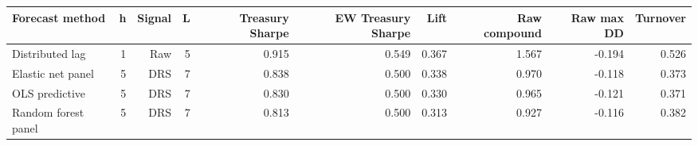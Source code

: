 \begin{tabular}{lrrrrrrrrr}
\toprule
Forecast method & h & Signal & L & Treasury Sharpe & EW Treasury Sharpe & Lift & Raw compound & Raw max DD & Turnover \\
\midrule
Distributed lag & 1 & Raw & 5 & 0.915 & 0.549 & 0.367 & 1.567 & -0.194 & 0.526 \\
Elastic net panel & 5 & DRS & 7 & 0.838 & 0.500 & 0.338 & 0.970 & -0.118 & 0.373 \\
OLS predictive & 5 & DRS & 7 & 0.830 & 0.500 & 0.330 & 0.965 & -0.121 & 0.371 \\
Random forest panel & 5 & DRS & 7 & 0.813 & 0.500 & 0.313 & 0.927 & -0.116 & 0.382 \\
\bottomrule
\end{tabular}
